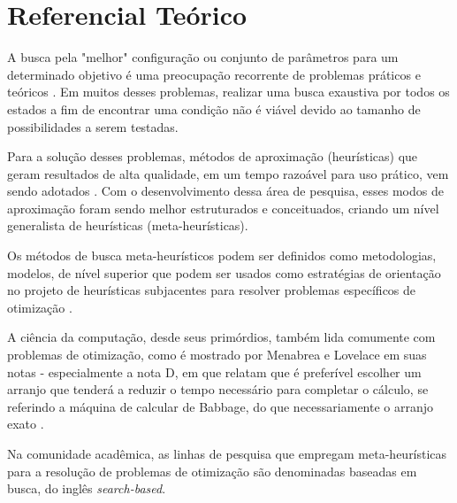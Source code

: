 
\chapter[Referencial Teórico]{Referencial Teórico}

A busca pela "melhor" configuração ou conjunto de parâmetros para um determinado objetivo é uma preocupação recorrente de problemas práticos e teóricos \cite{combinatorialoptimization1998}. Em muitos desses problemas, realizar uma busca exaustiva por todos os estados a fim de encontrar uma condição não é viável devido ao tamanho de possibilidades a serem testadas. 

Para a solução desses problemas, métodos de aproximação (heurísticas) que geram resultados de alta qualidade, em um tempo razoável para uso prático, vem sendo adotados \cite{gendreau2005metaheuristics}. Com o desenvolvimento dessa área de pesquisa, esses modos de aproximação foram sendo melhor estruturados e conceituados, criando um nível generalista de heurísticas (meta-heurísticas).

Os métodos de busca meta-heurísticos podem ser definidos como metodologias, modelos, de nível superior que podem ser usados como estratégias de orientação no projeto de heurísticas subjacentes para resolver problemas específicos de otimização \cite{talbi2009metaheuristics}.

A ciência da computação, desde seus primórdios, também lida comumente com problemas de otimização, como é mostrado por Menabrea e Lovelace em suas notas - especialmente a nota D, em que relatam que é preferível escolher um arranjo que tenderá a reduzir o tempo necessário para completar o cálculo, se referindo a máquina de calcular de Babbage, do que necessariamente o arranjo exato \cite{menabrea1842sketch}.

Na comunidade acadêmica, as linhas de pesquisa que empregam meta-heurísticas para a resolução de problemas de otimização são denominadas baseadas em busca, do inglês \textit{search-based}.

